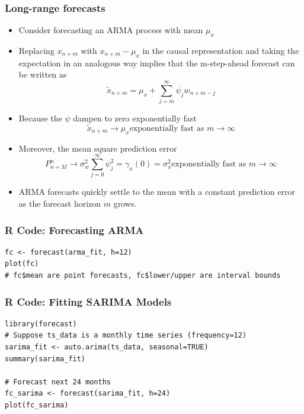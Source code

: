 \documentclass{article}
\begin{document}
\subsubsection{Long-range forecasts}
\begin{itemize}
    \item Consider forecasting an ARMA process with mean $\mu_x$
    \item Replacing $x_{n+m}$ with $x_{n+m} - \mu_x$ in the causal representation and taking the expectation in an analogous way implies that the m-step-ahead forecast can be written as
    \begin{equation*}
        \tilde{x}_{n+m} = \mu_x + \sum_{j=m}^\infty \psi_j w_{n+m-j}
    \end{equation*}
    \item Because the $\psi$ dampen to zero exponentially fast
    \begin{equation*}
        \tilde{x}_{n+m} \rightarrow \mu_x \text{exponentially fast as } m \rightarrow \infty
    \end{equation*}
    \item Moreover, the mean square prediction error
    \begin{equation*}
        P_{n+M}^n \rightarrow \sigma^2_w \sum_{j=0}^\infty \psi_j^2 = \gamma_x(0) = \sigma^2_x \text{exponentially fast as } m \rightarrow \infty
    \end{equation*}
    \item ARMA forecasts quickly settle to the mean with a constant prediction error as the forecast horizon $m$ grows.
\end{itemize}


\subsubsection{R Code: Forecasting ARMA}
\begin{lstlisting}
fc <- forecast(arma_fit, h=12)
plot(fc)
# fc$mean are point forecasts, fc$lower/upper are interval bounds
\end{lstlisting}


\subsubsection{R Code: Fitting SARIMA Models}
\begin{lstlisting}
library(forecast)
# Suppose ts_data is a monthly time series (frequency=12)
sarima_fit <- auto.arima(ts_data, seasonal=TRUE)
summary(sarima_fit)

# Forecast next 24 months
fc_sarima <- forecast(sarima_fit, h=24)
plot(fc_sarima)
\end{lstlisting}
\end{document}
